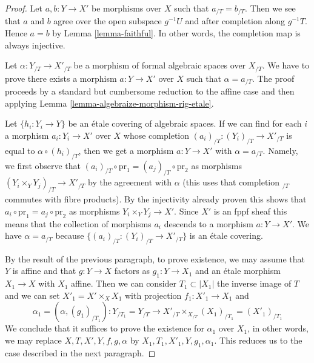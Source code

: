 \begin{proof}
Let $a, b : Y \to X'$ be morphisms over $X$ such that
$a_{/T} = b_{/T}$. Then we see that $a$ and $b$ agree over the open
subspace $g^{-1}U$ and after completion along $g^{-1}T$.
Hence $a = b$ by Lemma \ref{lemma-faithful}.
In other words, the completion map is always injective.

\medskip\noindent
Let $\alpha : Y_{/T} \to X'_{/T}$ be a morphism of formal algebraic spaces
over $X_{/T}$. We have to prove there exists a morphism $a : Y \to X'$
over $X$ such that $\alpha = a_{/T}$. The proof proceeds by a standard
but cumbersome reduction to the affine case and then applying
Lemma \ref{lemma-algebraize-morphism-rig-etale}.

\medskip\noindent
Let $\{h_i : Y_i \to Y\}$ be an \'etale covering of algebraic spaces.
If we can find for each $i$ a morphism $a_i : Y_i \to X'$ over $X$
whose completion $(a_i)_{/T} : (Y_i)_{/T} \to X'_{/T}$ is equal to
$\alpha \circ (h_i)_{/T}$, then we get a morphism $a : Y \to X'$
with $\alpha = a_{/T}$. Namely, we first observe that
$(a_i)_{/T} \circ \text{pr}_1 = (a_j)_{/T} \circ \text{pr}_2$
as morphisms $(Y_i \times_Y Y_j)_{/T} \to X'_{/T}$ by the
agreement with $\alpha$ (this uses that completion ${}_{/T}$ commutes
with fibre products). By the injectivity already proven this shows that
$a_i \circ \text{pr}_1 = a_j \circ \text{pr}_2$ as morphisms
$Y_i \times_Y Y_j \to X'$. Since $X'$ is an fppf sheaf this means that
the collection of morphisms $a_i$ descends to a morphism $a : Y \to X'$.
We have $\alpha = a_{/T}$ because $\{(a_i)_{/T} : (Y_i)_{/T} \to X'_{/T}\}$
is an \'etale covering.

\medskip\noindent
By the result of the previous paragraph, to prove existence,
we may assume that $Y$ is affine and that $g : Y \to X$ factors
as $g_1 : Y \to X_1$ and an \'etale morphism $X_1 \to X$ with $X_1$ affine.
Then we can consider $T_1 \subset |X_1|$ the inverse image of $T$
and we can set $X'_1 = X' \times_X X_1$ with projection $f_1 : X'_1 \to X_1$
and
$$
\alpha_1 = (\alpha, (g_1)_{/T_1}) :
Y_{/T_1} = Y_{/T}
\longrightarrow
X'_{/T} \times_{X_{/T}} (X_1)_{/T_1} = (X'_1)_{/T_1}
$$
We conclude that it suffices to prove the existence for $\alpha_1$
over $X_1$, in other words, we may replace $X, T, X', Y, f, g, \alpha$
by $X_1, T_1, X'_1, Y, g_1, \alpha_1$.
This reduces us to the case described in the next paragraph.


\end{proof}

